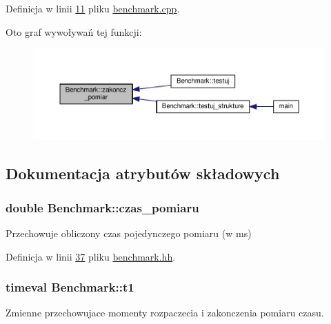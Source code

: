 Definicja w linii \hyperlink{benchmark_8cpp_source_l00011}{11} pliku \hyperlink{benchmark_8cpp_source}{benchmark.\-cpp}.



Oto graf wywoływań tej funkcji\-:\nopagebreak
\begin{figure}[H]
\begin{center}
\leavevmode
\includegraphics[width=350pt]{class_benchmark_a3f4b4595a3d1145d238f5b3c8486d875_icgraph}
\end{center}
\end{figure}




\subsection{Dokumentacja atrybutów składowych}
\hypertarget{class_benchmark_ab72b3cbe324970fd8c738f03718d52fc}{
\subsubsection[{czas\-\_\-pomiaru}]{\setlength{\rightskip}{0pt plus 5cm}double Benchmark\-::czas\-\_\-pomiaru\hspace{0.3cm}{\ttfamily [private]}}}\label{class_benchmark_ab72b3cbe324970fd8c738f03718d52fc}
Przechowuje obliczony czas pojedynczego pomiaru (w ms) 

Definicja w linii \hyperlink{benchmark_8hh_source_l00037}{37} pliku \hyperlink{benchmark_8hh_source}{benchmark.\-hh}.

\hypertarget{class_benchmark_ab951e55dc4470926e0eb0761804f13bc}{
\subsubsection[{t1}]{\setlength{\rightskip}{0pt plus 5cm}timeval Benchmark\-::t1\hspace{0.3cm}{\ttfamily [private]}}}\label{class_benchmark_ab951e55dc4470926e0eb0761804f13bc}
Zmienne przechowujace momenty rozpaczecia i zakonczenia pomiaru czasu. 


